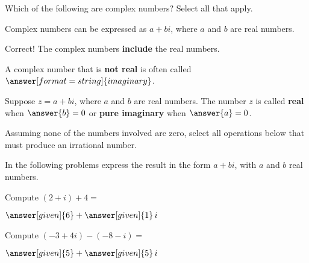 \documentclass[nooutcomes]{ximera}
\begin{document}
\begin{problem}
Which of the following are complex numbers?  Select all that apply.

\begin{selectAll}
\end{selectAll}
\begin{hint}
Complex numbers can be expressed as $a+bi$, where $a$ and $b$ are real numbers.  
\end{hint}
\begin{problem}
Correct! The complex numbers \textbf{include} the real numbers.

A complex number that is \textbf{not real} is often called 
$\answer[format=string]{imaginary}$. 

Suppose $z=a+bi$, where $a$ and $b$ are real numbers.  The number $z$ is called \textbf{real} when $\answer{b}=0$ or 
\textbf{pure imaginary} when $\answer{a}=0$.  
\end{problem}
\end{problem}


\begin{problem}
Assuming none of the numbers involved are zero, select all operations below that must produce an irrational number.

\begin{selectAll}
\end{selectAll}
\end{problem}

In the following problems express the result in the form $a+bi$, with $a$ and $b$ real numbers.  

\begin{problem}
Compute $(2+i) + 4 = $ 
\begin{prompt}
	$\answer[given]{6} + \answer[given]{1}\,i$
\end{prompt}
\end{problem}


\begin{problem}
Compute $(-3+4i) - (-8 - i) =$
\begin{prompt}
	$\answer[given]{5} + \answer[given]{5}\,i$
\end{prompt}
\end{problem}
\end{document}
